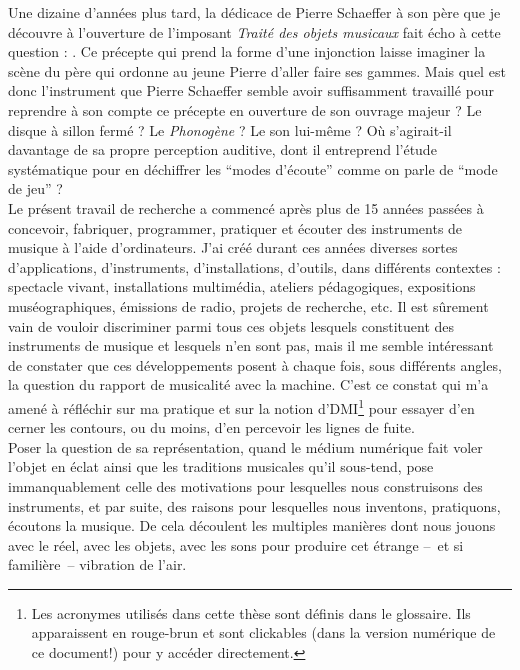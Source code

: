 \indent Une dizaine d'années plus tard, la dédicace de Pierre Schaeffer à son père que je découvre à l'ouverture de l'imposant \textit{Traité des objets musicaux} fait écho à cette question : . 
Ce précepte qui prend la forme d'une injonction laisse imaginer la scène du père qui ordonne au jeune Pierre d'aller faire ses gammes. Mais quel est donc l'instrument que Pierre Schaeffer semble avoir suffisamment travaillé pour reprendre à son compte ce précepte en ouverture de son ouvrage majeur ? Le disque à sillon fermé ? Le \textit{Phonogène} ? Le son lui-même ? Où s'agirait-il davantage de sa propre perception auditive, dont il entreprend l'étude systématique pour en déchiffrer les ``modes d'écoute'' comme on parle de ``mode de jeu'' ?\\
\indent Le présent travail de recherche a commencé après plus de 15 années passées à concevoir, fabriquer, programmer, pratiquer et écouter des instruments de musique à l'aide d'ordinateurs. J'ai créé durant ces années diverses sortes d'applications, d'instruments, d'installations, d'outils, dans différents contextes : spectacle vivant, installations multimédia, ateliers pédagogiques, expositions muséographiques, émissions de radio, projets de recherche, etc. Il est sûrement vain de vouloir discriminer parmi tous ces objets lesquels constituent des instruments de musique et lesquels n'en sont pas, mais il me semble intéressant de constater que ces développements posent à chaque fois, sous différents angles, la question du rapport de musicalité avec la machine. C'est ce constat qui m'a amené à réfléchir sur ma pratique et sur la notion d'\gls{DMI}\footnote{Les acronymes utilisés dans cette thèse sont définis dans le glossaire. Ils apparaissent en \textcolor{glscolor}{rouge-brun} et sont clickables (dans la version numérique de ce document!) pour y accéder directement.} pour essayer d'en cerner les contours, ou du moins, d'en percevoir les lignes de fuite.\\
\indent Poser la question de sa représentation, quand le médium numérique fait voler l’objet en éclat ainsi que les traditions musicales qu’il sous-tend, pose immanquablement celle des motivations pour lesquelles nous construisons des instruments, et par suite, des raisons pour lesquelles nous inventons, pratiquons, écoutons la musique. De cela découlent les multiples manières dont nous jouons avec le réel, avec les objets, avec les sons pour produire cet étrange --~et si familière~-- vibration de l'air.\\
